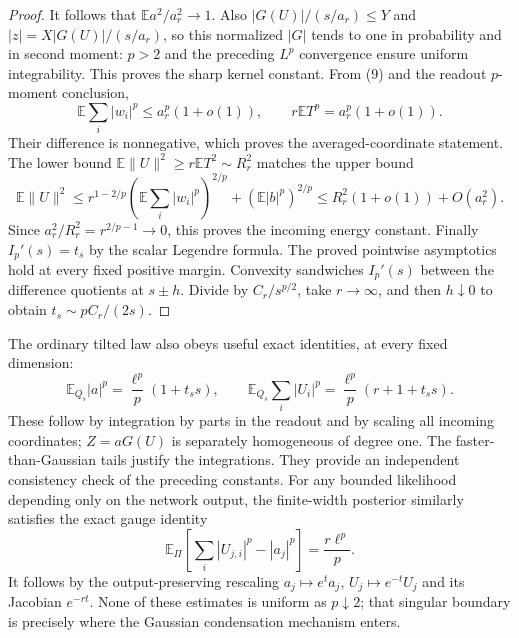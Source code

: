 \documentclass[11pt]{article}
\newcommand{\E}{\mathbb E}\newcommand{\Pp}{\mathbb P}
\begin{document}
\begin{proof}
It follows that $\E a^2/a_r^2\to1$. Also
$|G(U)|/(s/a_r)\le Y$ and $|z|=X|G(U)|/(s/a_r)$, so this
normalized $|G|$ tends to one in probability and in second moment:
$p>2$ and the preceding $L^p$ convergence ensure uniform integrability.
This proves the sharp kernel constant. From (9) and the readout
$p$-moment conclusion,
\[
 \E\sum_i|w_i|^p\le a_r^p(1+o(1)),\qquad
 r\E T^p=a_r^p(1+o(1)).
\]
Their difference is nonnegative, which proves the averaged-coordinate
statement. The lower bound
$\E\|U\|^2\ge r\E T^2\sim R_r^2$ matches the upper bound
\[
 \E\|U\|^2\le
 r^{1-2/p}(\E\sum_i|w_i|^p)^{2/p}
                 +(\E|b|^p)^{2/p}
 \le R_r^2(1+o(1))+O(a_r^2).
\]
Since $a_r^2/R_r^2=r^{2/p-1}\to0$, this proves the incoming energy
constant. Finally $I_p'(s)=t_s$ by the scalar Legendre formula.
The proved pointwise asymptotics hold at every fixed positive margin.
Convexity sandwiches $I_p'(s)$ between the difference quotients at
$s\pm h$. Divide by $C_r/s^{p/2}$, take $r\to\infty$, and then
$h\downarrow0$ to obtain $t_s\sim pC_r/(2s)$.
\end{proof}

The ordinary tilted law also obeys useful exact identities, at every
fixed dimension:
\[
 \E_{Q_s}|a|^p=\frac{\ell^p}{p}(1+t_ss),\qquad
 \E_{Q_s}\sum_i|U_i|^p=\frac{\ell^p}{p}(r+1+t_ss).
                                                               \tag{10}
\]
These follow by integration by parts in the readout and by scaling all
incoming coordinates; $Z=aG(U)$ is separately homogeneous of degree
one. The faster-than-Gaussian tails justify the integrations. They
provide an independent consistency check of the preceding constants.
For any bounded likelihood depending only on the network output, the
finite-width posterior similarly satisfies the exact gauge identity
\[
 \E_{\Pi}\left[\sum_i|U_{j,i}|^p-|a_j|^p\right]
                       =\frac{r\ell^p}{p}.
\]
It follows by the output-preserving rescaling
$a_j\mapsto e^ta_j$, $U_j\mapsto e^{-t}U_j$ and its Jacobian $e^{-rt}$.
None of these estimates is uniform as $p\downarrow2$; that singular
boundary is precisely where the Gaussian condensation mechanism enters.
\end{document}
